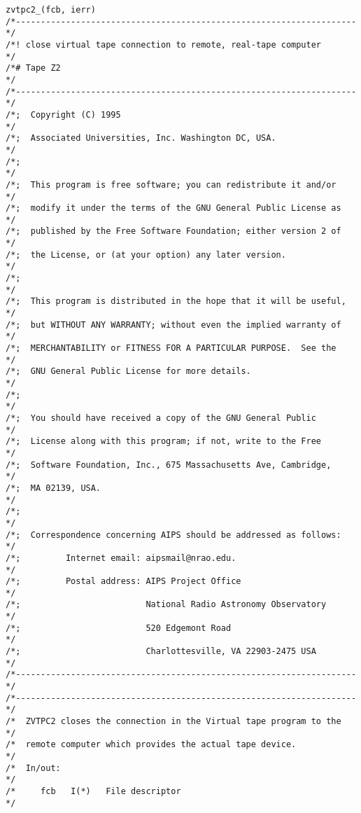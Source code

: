 \begin{center}
\begin{verbatim}
zvtpc2_(fcb, ierr)
/*--------------------------------------------------------------------*/
/*! close virtual tape connection to remote, real-tape computer       */
/*# Tape Z2                                                           */
/*--------------------------------------------------------------------*/
/*;  Copyright (C) 1995                                               */
/*;  Associated Universities, Inc. Washington DC, USA.                */
/*;                                                                   */
/*;  This program is free software; you can redistribute it and/or    */
/*;  modify it under the terms of the GNU General Public License as   */
/*;  published by the Free Software Foundation; either version 2 of   */
/*;  the License, or (at your option) any later version.              */
/*;                                                                   */
/*;  This program is distributed in the hope that it will be useful,  */
/*;  but WITHOUT ANY WARRANTY; without even the implied warranty of   */
/*;  MERCHANTABILITY or FITNESS FOR A PARTICULAR PURPOSE.  See the    */
/*;  GNU General Public License for more details.                     */
/*;                                                                   */
/*;  You should have received a copy of the GNU General Public        */
/*;  License along with this program; if not, write to the Free       */
/*;  Software Foundation, Inc., 675 Massachusetts Ave, Cambridge,     */
/*;  MA 02139, USA.                                                   */
/*;                                                                   */
/*;  Correspondence concerning AIPS should be addressed as follows:   */
/*;         Internet email: aipsmail@nrao.edu.                        */
/*;         Postal address: AIPS Project Office                       */
/*;                         National Radio Astronomy Observatory      */
/*;                         520 Edgemont Road                         */
/*;                         Charlottesville, VA 22903-2475 USA        */
/*--------------------------------------------------------------------*/
/*--------------------------------------------------------------------*/
/*  ZVTPC2 closes the connection in the Virtual tape program to the   */
/*  remote computer which provides the actual tape device.            */
/*  In/out:                                                           */
/*     fcb   I(*)   File descriptor                                   */

\end{verbatim}
\end{center}
